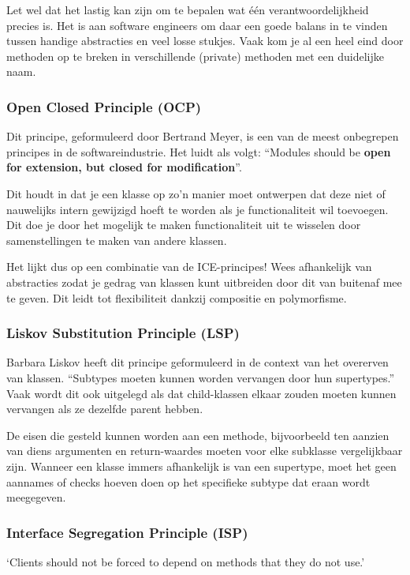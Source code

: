 Let wel dat het lastig kan zijn om te bepalen wat één
verantwoordelijkheid precies is. Het is aan software engineers om daar een 
goede balans in te vinden tussen handige abstracties en veel losse stukjes.
Vaak kom je al een heel eind door methoden op te breken in verschillende 
(private) methoden met een duidelijke naam.

\subsubsection{Open Closed Principle (OCP)}
Dit principe, geformuleerd door Bertrand Meyer, 
is een van de meest onbegrepen principes in 
de softwareindustrie.
Het luidt als volgt: ``Modules should be 
\textbf{open for extension, but closed for modification}''.

Dit houdt in dat je een klasse op zo'n manier moet ontwerpen
dat deze niet of nauwelijks intern gewijzigd hoeft te worden 
als je functionaliteit wil toevoegen. Dit doe je door het mogelijk 
te maken functionaliteit uit te wisselen door samenstellingen te 
maken van andere klassen.

Het lijkt dus op een combinatie van de ICE-principes!
Wees afhankelijk van abstracties zodat je gedrag van klassen
kunt uitbreiden door dit van buitenaf mee te geven.
Dit leidt tot flexibiliteit dankzij compositie en 
polymorfisme.

\subsubsection{Liskov Substitution Principle (LSP)}
Barbara Liskov heeft dit principe geformuleerd in de context 
van het overerven van klassen. ``Subtypes moeten kunnen worden 
vervangen door hun supertypes.'' Vaak wordt dit ook uitgelegd 
als dat child-klassen elkaar zouden moeten kunnen vervangen als 
ze dezelfde parent hebben.

De eisen die gesteld kunnen worden aan een methode, bijvoorbeeld 
ten aanzien van diens argumenten en return-waardes moeten voor 
elke subklasse vergelijkbaar zijn. Wanneer een klasse immers 
afhankelijk is van een supertype,
moet het geen aannames of checks hoeven doen op het specifieke 
subtype dat eraan wordt meegegeven.

\subsubsection{Interface Segregation Principle (ISP)}
`Clients should not be forced to depend on methods 
that they do not use.'


